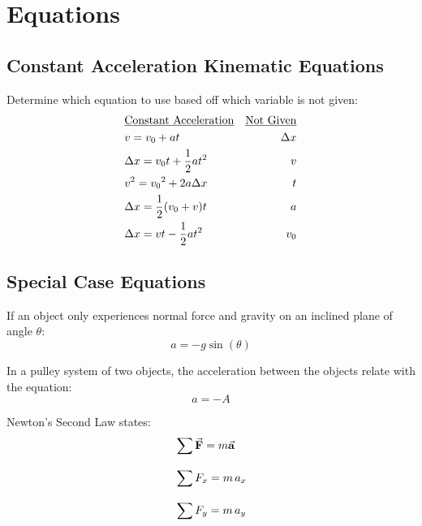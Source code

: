\documentclass{article}
\begin{document}
\section{Equations}
\subsection{Constant Acceleration Kinematic Equations}
Determine which equation to use based off which variable 
is not given:
\begin{align*}
    &\text{\underline{Constant Acceleration}} &\text{\underline{Not Given}} 
    \\
    &v = v_0 + at                      &\Delta{x}        \\
    &\Delta{x} = v_0t + \frac{1}{2}at^2 &v                \\
    &v^2 = {v_0}^2 + 2a\Delta{x}     &t                \\
    &\Delta{x} = \frac{1}{2}(v_0+v)t   &a                \\
    &\Delta{x} = vt - \frac{1}{2}at^2  &v_0
\end{align*}

\subsection{Special Case Equations}
If an object only experiences normal force and gravity on an inclined plane of angle $\theta$:
\[ a = -g\sin(\theta) \]        

\bigskip 

\noindent In a pulley system of two objects, the acceleration between the objects relate with the equation:
\[ a = -A \]

\bigskip

\noindent Newton's Second Law states:
\begin{align*}
    &\sum \va{F} = m\va{a} \\[2ex]
    &\sum F_x = m\,a_x \\[2ex]
    &\sum F_y = m\,a_y
\end{align*}
\end{document}
